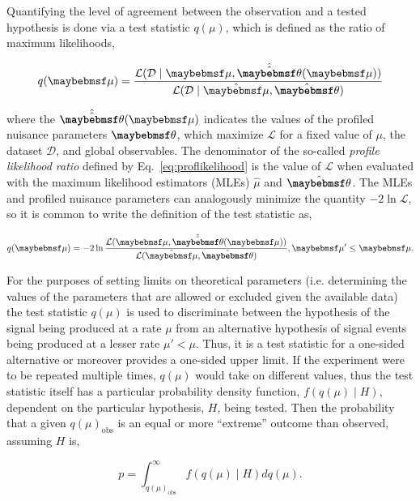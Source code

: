 Quantifying the level of agreement between the observation and a tested hypothesis is done via a test statistic $q(\mu)$, which is defined as the ratio of maximum likelihoods,

\begin{equation}
  q(\mu) = \frac{\mathcal{L}(\mathcal{D}\mid\mu,\hat{\hat{\textbf{\theta}}}(\mu))}{\mathcal{L}(\mathcal{D}\mid\hat{\mu},\hat{\textbf{\theta}})}
  \label{eq:proflikelihood}
\end{equation}

where the $\hat{\hat{\textbf{\theta}}}(\mu)$ indicates the values of the profiled nuisance parameters $\textbf{\theta}$, which maximize $\mathcal{L}$ for a fixed value of $\mu$, the dataset $\mathcal{D}$, and global observables. The denominator of the so-called \textit{profile likelihood ratio} defined by Eq.~\ref{eq:proflikelihood} is the value of $\mathcal{L}$ when evaluated with the maximum likelihood estimators (MLEs) $\hat{\mu}$ and $\hat{\textbf{\theta}}$. The MLEs and profiled nuisance parameters can analogously minimize the quantity $-2\ln{\mathcal{L}}$, so it is common to write the definition of the test statistic as,

\begin{equation}
   q(\mu) = -2\ln{\frac{\mathcal{L}(\mu,\hat{\hat{\textbf{\theta}}}(\mu))}{\mathcal{L}(\hat{\mu},\hat{\textbf{\theta}})}}, \mu' \leq \mu.
   \label{eq:likelihood}
\end{equation}

For the purposes of setting limits on theoretical parameters (i.e. determining the values of the parameters that are allowed or excluded given the available data) the test statistic $q(\mu)$ is used to discriminate between the hypothesis of the signal being produced at a rate $\mu$ from an alternative hypothesis of signal events being produced at a lesser rate $\mu' < \mu$. Thus, it is a test statistic for a one-sided alternative or moreover provides a one-sided upper limit. If the experiment were to be repeated multiple times, $q(\mu)$ would take on different values, thus the test statistic itself has a particular probability density function, $f(q(\mu)\mid H)$, dependent on the particular hypothesis, $H$, being tested. Then the probability that a given $q(\mu)_{\textrm{obs}}$ is an equal or more ``extreme'' outcome than observed, assuming $H$ is,

\begin{equation}
  p = \int_{q(\mu)_{\textrm{obs}}}^{\infty} f(q(\mu)\mid H)\xspace dq(\mu).
\label{eq:pvalue}
\end{equation}

